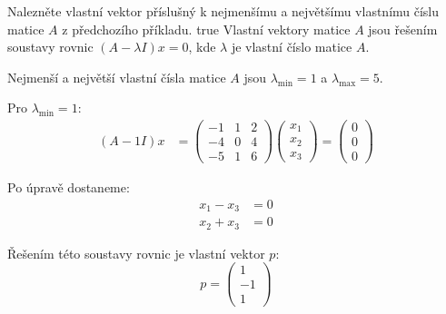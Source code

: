 \documentclass[10pt, a4paper]{ReportSheet}
\begin{document}
    \begin{uloha}{4}{3}{
        Nalezněte vlastní vektor příslušný k nejmenšímu a největšímu vlastnímu číslu matice $A$ z předchozího příkladu.
    }{true}
        Vlastní vektory matice $A$ jsou řešením soustavy rovnic $(A - \lambda I)x = 0$, kde $\lambda$ je vlastní číslo matice $A$.

        Nejmenší a největší vlastní čísla matice $A$ jsou $\lambda_{\min} = 1$ a $\lambda_{\max} = 5$.

        Pro $\lambda_{\min} = 1$:
        \begin{equation*}
            \begin{aligned}
            (A - 1I)
                x &= \begin{pmatrix}
                         -1 & 1 & 2 \\
                         -4 & 0 & 4 \\
                         -5 & 1 & 6
                \end{pmatrix} \begin{pmatrix}
                                  x_1 \\
                                  x_2 \\
                                  x_3
                \end{pmatrix} = \begin{pmatrix}
                                    0 \\
                                    0 \\
                                    0
                \end{pmatrix}
            \end{aligned}
        \end{equation*}

        Po úpravě dostaneme:
        \begin{equation*}
            \begin{aligned}
                x_1 - x_3 &= 0 \\
                x_2 + x_3 &= 0
            \end{aligned}
        \end{equation*}

        Řešením této soustavy rovnic je vlastní vektor $p$:
        \begin{equation*}
            p = \begin{pmatrix}
                    1  \\
                    -1 \\
                    1
            \end{pmatrix}
        \end{equation*}


\end{uloha}
\end{document}

